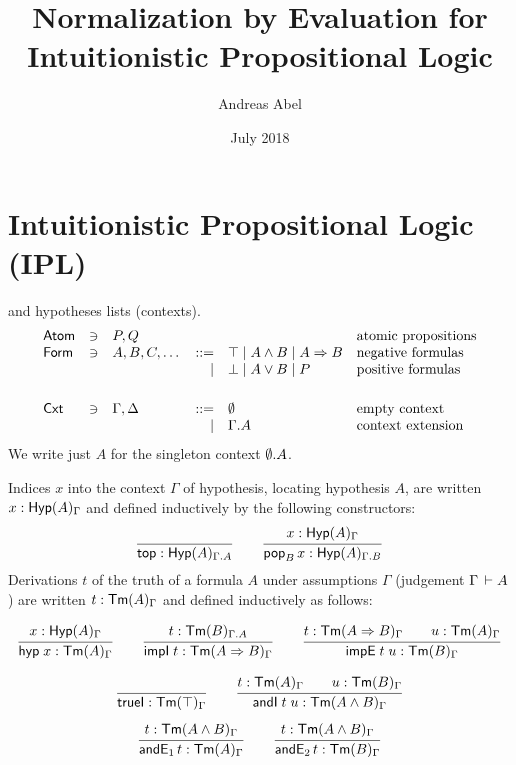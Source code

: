 \documentclass[a4paper]{article}
\title{Normalization by Evaluation for \\ Intuitionistic Propositional Logic}
\author{Andreas Abel}
\date{July 2018}
\begin{document}
\maketitle


\section{Intuitionistic Propositional Logic (IPL)}

 and hypotheses lists (contexts).
\[
\begin{array}{lllrll}
  \Atom & \ni & P,Q & & & \mbox{atomic propositions} \\
  \Form & \ni & A,B,C,\dots
     & ::= & \top \mid A \land B \mid A \imp B
       & \mbox{negative formulas} \\
     &&& \mid & \bot \mid A \lor B \mid P
       & \mbox{positive formulas} \\
\\[1ex]
  \Cxt & \ni & \Gamma,\Delta & ::= & \cempty & \mbox{empty context}
\\ &&& \mid & \Gamma.A & \mbox{context extension}
\end{array}
\]
We write just $A$ for the singleton context $\cempty.A$.

Indices $x$ into the context $\Gamma$ of hypothesis, locating hypothesis
$A$, are written $x : \Hyp[\Gamma]A$ and defined inductively by the
following constructors:
\[
  \ru{}{\ttop : \Hyp[\Gamma.A]A}
\qquad
  \ru{x : \Hyp[\Gamma]A
    }{\pop[B] x : \Hyp[\Gamma.B]A}
\]
Derivations $t$ of the truth of a formula $A$ under assumptions
$\Gamma$ (judgement $\Gamma \der A$)
are written $t : \Tm[\Gamma]A$ and defined inductively as follows:

\begin{gather*}
  \ru{x : \Hyp[\Gamma]A}{\hyp x : \TmG A}
\qquad
  \ru{t : \Tm[\Gamma.A]B}{\impI t : \TmG{A \imp B}}
\qquad
  \ru{t : \TmG{A \imp B} \qquad
      u : \TmG A
    }{\impE t u : \TmG B}
\end{gather*}

\begin{gather*}
  \ru{}{\trueI : \TmG\top}
\qquad
  \ru{t : \TmG A \qquad
      u : \TmG B
    }{\andI t u : \TmG{A \land B}
    }
\\[1ex]
  \ru{t : \TmG{A \land B}
    }{\andE1 t : \TmG A
    }
\qquad
  \ru{t : \TmG{A \land B}
    }{\andE2 t : \TmG B
    }
\end{gather*}
\end{document}
